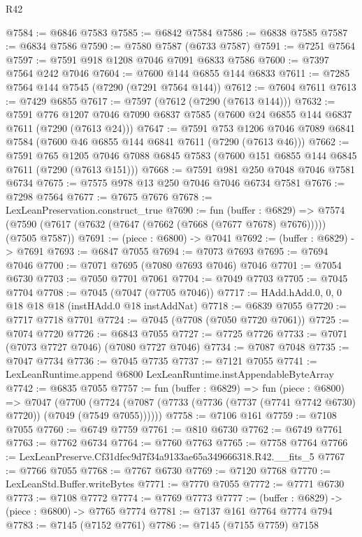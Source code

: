 \begin{lexlean}{R42}
\begin{coremodule}
{@7584 := @6846 @7583
@7585 := @6842 @7584
@7586 := @6838 @7585
@7587 := @6834 @7586
@7590 := @7580 @7587 (@6733 @7587)
@7591 := @7251 @7564
@7597 := @7591 @918 @1208 @7046 @7091 @6833 @7586
@7600 := @7397 @7564 @242 @7046
@7604 := @7600 @144 @6855 @144 @6833
@7611 := @7285 @7564 @144 @7545 (@7290 (@7291 @7564 @144))
@7612 := @7604 @7611
@7613 := @7429 @6855
@7617 := @7597 (@7612 (@7290 (@7613 @144)))
@7632 := @7591
    @776
    @1207
    @7046
    @7090
    @6837
    @7585
    (@7600 @24 @6855 @144 @6837 @7611 (@7290 (@7613 @24)))
@7647 := @7591
    @753
    @1206
    @7046
    @7089
    @6841
    @7584
    (@7600 @46 @6855 @144 @6841 @7611 (@7290 (@7613 @46)))
@7662 := @7591
    @765
    @1205
    @7046
    @7088
    @6845
    @7583
    (@7600 @151 @6855 @144 @6845 @7611 (@7290 (@7613 @151)))
@7668 := @7591 @981 @250 @7048 @7046 @7581 @6734
@7675 := @7575 @978 @13 @250 @7046 @7046 @6734 @7581
@7676 := @7298 @7564
@7677 := @7675 @7676
@7678 := LexLeanPreservation.construct_true
@7690 := fun (buffer : @6829) =>
  @7574 (@7590 (@7617 (@7632 (@7647 (@7662 (@7668 (@7677 @7678) @7676))))) (@7505 @7587))
@7691 := (piece : @6800) -> @7041
@7692 := (buffer : @6829) -> @7691
@7693 := @6847 @7055
@7694 := @7073 @7693
@7695 := @7694 @7046
@7700 := @7071 @7695 (@7080 @7693 @7046) @7046
@7701 := @7054 @6730
@7703 := @7050 @7701 @7061
@7704 := @7049 @7703
@7705 := @7045 @7704
@7708 := @7045 (@7047 (@7705 @7046))
@7717 := HAdd.hAdd.{0, 0, 0} @18 @18 @18 (instHAdd.{0} @18 instAddNat)
@7718 := @6839 @7055
@7720 := @7717 @7718 @7701
@7724 := @7045 (@7708 (@7050 @7720 @7061))
@7725 := @7074 @7720
@7726 := @6843 @7055
@7727 := @7725 @7726
@7733 := @7071 (@7073 @7727 @7046) (@7080 @7727 @7046)
@7734 := @7087 @7048
@7735 := @7047 @7734
@7736 := @7045 @7735
@7737 := @7121 @7055
@7741 := LexLeanRuntime.append @6800 LexLeanRuntime.instAppendableByteArray
@7742 := @6835 @7055
@7757 := fun (buffer : @6829) =>
  fun (piece : @6800) =>
  @7047
    (@7700 (@7724 (@7087 (@7733 (@7736 (@7737 (@7741 @7742 @6730) @7720)) (@7049 (@7549 @7055))))))
@7758 := @7106 @161
@7759 := @7108 @7055
@7760 := @6749 @7759
@7761 := @810 @6730
@7762 := @6749 @7761
@7763 := @7762 @6734
@7764 := @7760 @7763
@7765 := @7758 @7764
@7766 := LexLeanPreserve.Cf31dfec9d7f34a9133ae65a349666318.R42.__fits_5
@7767 := @7766 @7055
@7768 := @7767 @6730
@7769 := @7120 @7768
@7770 := LexLeanStd.Buffer.writeBytes
@7771 := @7770 @7055
@7772 := @7771 @6730
@7773 := @7108 @7772
@7774 := @7769 @7773
@7777 := (buffer : @6829) -> (piece : @6800) -> @7765 @7774
@7781 := @7137 @161 @7764 @7774 @794
@7783 := @7145 (@7152 @7761)
@7786 := @7145 (@7155 @7759) @7158
}
\end{coremodule}
\end{lexlean}
